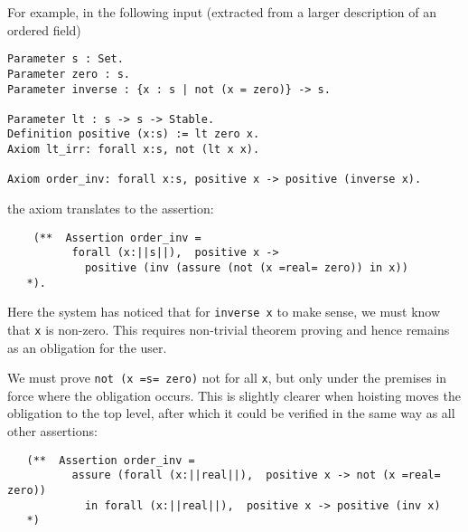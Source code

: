 For example, in the following input (extracted from a larger description of an ordered field)
\begin{Verbatim}
Parameter s : Set.
Parameter zero : s.
Parameter inverse : {x : s | not (x = zero)} -> s.

Parameter lt : s -> s -> Stable.
Definition positive (x:s) := lt zero x.
Axiom lt_irr: forall x:s, not (lt x x).

Axiom order_inv: forall x:s, positive x -> positive (inverse x).
\end{Verbatim}
the axiom translates to the assertion:
\begin{Verbatim}
	(**  Assertion order_inv = 
          forall (x:||s||),  positive x ->
            positive (inv (assure (not (x =real= zero)) in x))
   *).
\end{Verbatim}
Here the system has noticed that for \Verb|inverse x| to make sense, we must know that
\Verb|x| is non-zero.   This requires non-trivial theorem proving and hence remains as 
an obligation for the user.  

We must prove \Verb|not (x =s= zero)| not for all \Verb|x|, but only under
the premises in force where the obligation occurs.  This is slightly clearer when hoisting moves the
obligation to the top level, after which it could be verified in the same way as all other assertions:
\begin{Verbatim}
   (**  Assertion order_inv = 
          assure (forall (x:||real||),  positive x -> not (x =real= zero))
            in forall (x:||real||),  positive x -> positive (inv x)
   *)	
\end{Verbatim}



